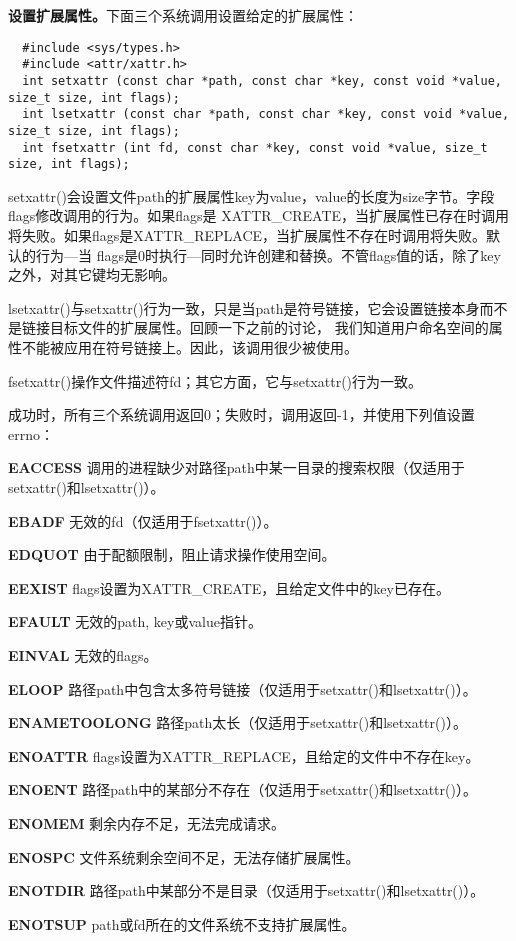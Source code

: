 \textbf{设置扩展属性。}下面三个系统调用设置给定的扩展属性：

\begin{lstlisting}
  #include <sys/types.h>
  #include <attr/xattr.h>
  int setxattr (const char *path, const char *key, const void *value, size_t size, int flags);
  int lsetxattr (const char *path, const char *key, const void *value, size_t size, int flags);
  int fsetxattr (int fd, const char *key, const void *value, size_t size, int flags);
\end{lstlisting}

setxattr()会设置文件path的扩展属性key为value，value的长度为size字节。字段flags修改调用的行为。如果flags是 XATTR\_CREATE，当扩展属性已存在时调用将失败。如果flags是XATTR\_REPLACE，当扩展属性不存在时调用将失败。默认的行为—当 flags是0时执行—同时允许创建和替换。不管flags值的话，除了key之外，对其它键均无影响。

lsetxattr()与setxattr()行为一致，只是当path是符号链接，它会设置链接本身而不是链接目标文件的扩展属性。回顾一下之前的讨论， 我们知道用户命名空间的属性不能被应用在符号链接上。因此，该调用很少被使用。

fsetxattr()操作文件描述符fd；其它方面，它与setxattr()行为一致。

成功时，所有三个系统调用返回0；失败时，调用返回-1，并使用下列值设置errno：

\begin{eqlist*}
\item[\textbf{EACCESS}] 调用的进程缺少对路径path中某一目录的搜索权限（仅适用于setxattr()和lsetxattr()）。
\item[\textbf{EBADF}] 无效的fd（仅适用于fsetxattr()）。
\item[\textbf{EDQUOT}] 由于配额限制，阻止请求操作使用空间。
\item[\textbf{EEXIST}] flags设置为XATTR\_CREATE，且给定文件中的key已存在。
\item[\textbf{EFAULT}] 无效的path, key或value指针。
\item[\textbf{EINVAL}] 无效的flags。
\item[\textbf{ELOOP}] 路径path中包含太多符号链接（仅适用于setxattr()和lsetxattr()）。
\item[\textbf{ENAMETOOLONG}] 路径path太长（仅适用于setxattr()和lsetxattr()）。
\item[\textbf{ENOATTR}] flags设置为XATTR\_REPLACE，且给定的文件中不存在key。
\item[\textbf{ENOENT}] 路径path中的某部分不存在（仅适用于setxattr()和lsetxattr()）。
\item[\textbf{ENOMEM}] 剩余内存不足，无法完成请求。
\item[\textbf{ENOSPC}] 文件系统剩余空间不足，无法存储扩展属性。
\item[\textbf{ENOTDIR}] 路径path中某部分不是目录（仅适用于setxattr()和lsetxattr()）。
\item[\textbf{ENOTSUP}] path或fd所在的文件系统不支持扩展属性。
\end{eqlist*}


